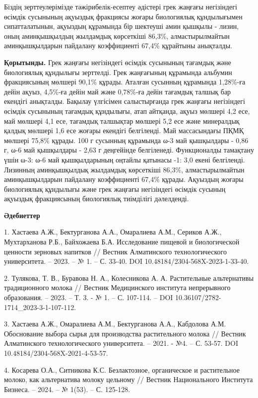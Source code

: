 Біздің зерттеулерімізде тәжірибелік-есептеу әдістері грек жаңғағы
негізіндегі өсімдік сусынының ақуыздық фракциясы жоғары биологиялық
құндылығымен сипатталатынын, ақуыздың құрамында бір шектеуші амин
қышқылы - лизин, оның аминқышқылдың жылдамдық көрсеткіші 86,3\%,
алмастырылмайтын аминқышқылдарын пайдалану коэффициенті 67,4\% құрайтыны
анықталды.

{\bfseries Қорытынды.} Грек жаңғағы негізіндегі өсімдік сусынының тағамдық
және биологиялық құндылығы зерттелді. Грек жаңғағының құрамында альбумин
фракциясының мөлшері 90,1\% құрады. Аталған сусынның құрамында 1,28\%-ға
дейін ақуыз, 4,5\%-ға дейін май және 0,78\%-ға дейін тағамдық талшық бар
екендігі анықталды. Бақылау үлгісімен салыстырғанда грек жаңғағы
негізіндегі өсімдік сусынының тағамдық құндылығы, атап айтқанда, ақуыз
мөлшері 4,2 есе, май мөлшері 4,1 есе, тағамдық талшықтар мөлшері 5,2 есе
және минералдық қалдық мөлшері 1,6 есе жоғары екендігі белгіленді. Май
массасындағы ПҚМҚ мөлшері 75,8\% құрады. 100 г сусынның құрамында ω-3
май қышқылдары - 0,86 г, ω-6 май қышқылдары - 2,63 г деңгейінде
белгіленеді. Функционалды тамақтану үшін ω-3: ω-6 май қышқылдарының
оңтайлы қатынасы -1: 3,0 екені белгіленді. Лизинның аминқышқылдық
жылдамдық көрсеткіші 86,3\%, алмастырылмайтын аминқышқылдарын пайдалану
коэффициенті 67,4\% құрады. Ақуыздың жоғары биологиялық құндылығы және
грек жаңғағы негізіндегі өсімдік сусының ақуыздық фракциясының
биологиялық тиімділігі дәлелденді.

{\bfseries Әдебиеттер}

1. Хастаева А.Ж., Бектурганова А.А., Омаралиева А.М., Сериков А.Ж.,
Мухтарханова Р.Б., Байхожаева Б.А. Исследование пищевой и биологической
ценности зерновых напитков // Вестник Алматинского технологического
университета. -- 2023. -- № 1. -- С. 33-40. DOI
10.48184/2304-568X-2023-1-33-40.

2. Тулякова, Т. В., Буравова Н. А., Колесникова А. А. Растительные
альтернативы традиционного молока // Вестник Медицинского института
непрерывного образования. -- 2023. -- Т. 3. - № 1. -- С. 107-114. -- DOI
10.36107/2782-1714\_2023-3-1-107-112.

3. Хастаева А.Ж., Омаралиева А.М., Бектурганова А.А., Кабдолова А.М.
Обоснование выбора сырья для производства растительного молока //
Вестник Алматинского технологического университета. -- 2021. - №4. -- С.
53-57. DOI 10.48184/2304-568X-2021-4-53-57.

4. Косарева О.А., Ситникова К.С. Безлактозное, органическое и
растительное молоко, как альтернатива молоку цельному // Вестник
Национального Института Бизнеса. -- 2024. -- № 1(53). -- С. 125-128.

